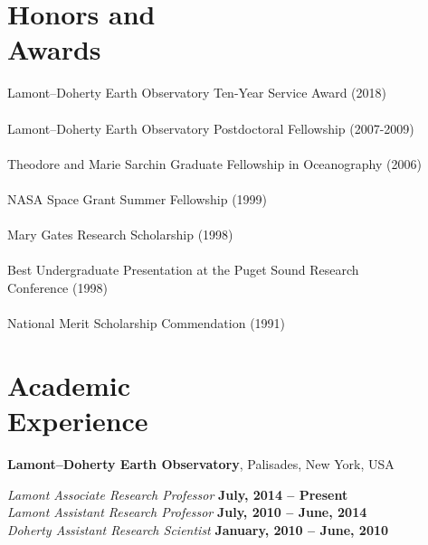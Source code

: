 \documentclass[11pt]{res}
\begin{document}
\begin{resume}
\section{\sc Honors and\\Awards} 

Lamont--Doherty Earth Observatory Ten-Year Service Award (2018) \\
\vspace*{0.5mm}\\
Lamont--Doherty Earth Observatory Postdoctoral Fellowship (2007-2009) \\
\vspace*{0.5mm}\\
Theodore and Marie Sarchin Graduate Fellowship in Oceanography (2006) \\
\vspace*{0.5mm}\\
NASA Space Grant Summer Fellowship (1999) \\
\vspace*{0.5mm}\\
Mary Gates Research Scholarship (1998) \\
\vspace*{0.5mm}\\
Best Undergraduate Presentation at the Puget Sound Research \\ Conference (1998) \\
\vspace*{0.5mm}\\
National Merit Scholarship Commendation (1991) \\

\section{\sc Academic\\Experience}

{\bf Lamont--Doherty Earth Observatory}, Palisades, New York, USA

{\em Lamont Associate Research Professor} \hfill {\bf July, 2014 -- Present}\\

\vspace{-.3cm}
{\em Lamont Assistant Research Professor} \hfill {\bf July, 2010 -- June, 2014}\\

\vspace{-.3cm}
{\em Doherty Assistant Research Scientist} \hfill {\bf January, 2010 -- June, 2010}\\


\end{resume}
\end{document}

